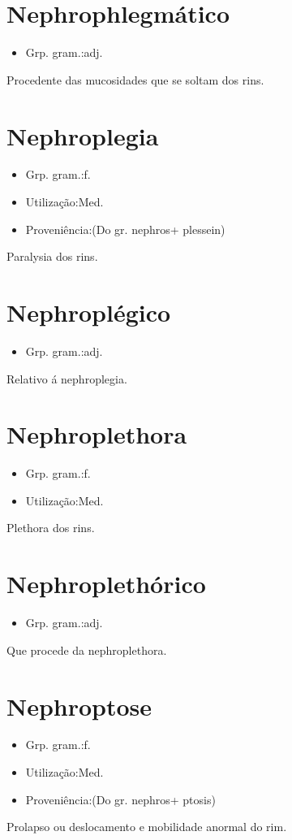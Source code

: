 \section{Nephrophlegmático}
\begin{itemize}
\item {Grp. gram.:adj.}
\end{itemize}
Procedente das mucosidades que se soltam dos rins.
\section{Nephroplegia}
\begin{itemize}
\item {Grp. gram.:f.}
\end{itemize}
\begin{itemize}
\item {Utilização:Med.}
\end{itemize}
\begin{itemize}
\item {Proveniência:(Do gr. \textunderscore nephros\textunderscore  + \textunderscore plessein\textunderscore )}
\end{itemize}
Paralysia dos rins.
\section{Nephroplégico}
\begin{itemize}
\item {Grp. gram.:adj.}
\end{itemize}
Relativo á nephroplegia.
\section{Nephroplethora}
\begin{itemize}
\item {Grp. gram.:f.}
\end{itemize}
\begin{itemize}
\item {Utilização:Med.}
\end{itemize}
Plethora dos rins.
\section{Nephroplethórico}
\begin{itemize}
\item {Grp. gram.:adj.}
\end{itemize}
Que procede da nephroplethora.
\section{Nephroptose}
\begin{itemize}
\item {Grp. gram.:f.}
\end{itemize}
\begin{itemize}
\item {Utilização:Med.}
\end{itemize}
\begin{itemize}
\item {Proveniência:(Do gr. \textunderscore nephros\textunderscore  + \textunderscore ptosis\textunderscore )}
\end{itemize}
Prolapso ou deslocamento e mobilidade anormal do rim.
